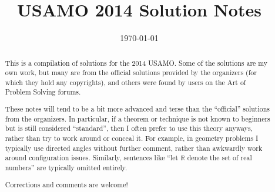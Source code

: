 \documentclass[11pt]{scrartcl}
\title{USAMO 2014 Solution Notes}
\date{\today}
\begin{document}
\maketitle

\begin{abstract}
This is a compilation of solutions
for the 2014 USAMO.
Some of the solutions are my own work,
but many are from the official solutions provided by the organizers
(for which they hold any copyrights),
and others were found by users on the Art of Problem Solving forums.

These notes will tend to be a bit more advanced and terse than the ``official''
solutions from the organizers.
In particular, if a theorem or technique is not known to beginners
but is still considered ``standard'', then I often prefer to
use this theory anyways, rather than try to work around or conceal it.
For example, in geometry problems I typically use directed angles
without further comment, rather than awkwardly work around configuration issues.
Similarly, sentences like ``let $\mathbb{R}$ denote the set of real numbers''
are typically omitted entirely.

Corrections and comments are welcome!
\end{abstract}

\tableofcontents
\newpage

\addtocounter{section}{-1}
\end{document}
